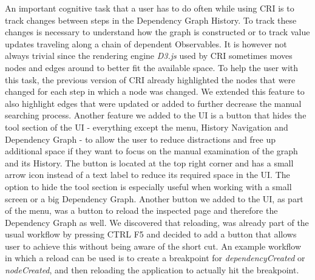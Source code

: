 An important cognitive task that a user has to do often while using CRI is to track changes between steps in the Dependency Graph History. To track these changes is necessary to understand how the graph is constructed or to track value updates traveling along a chain of dependent Observables. It is however not always trivial since the rendering engine \emph{D3.js} \cite{D3JS} used by CRI sometimes moves nodes and edges around to better fit the available space. To help the user with this task, the previous version of CRI already highlighted the nodes that were changed for each step in which a node was changed. We extended this feature to also highlight edges that were updated or added to further decrease the manual searching process. Another feature we added to the UI is a button that hides the tool section of the UI - everything except the menu, History Navigation and Dependency Graph - to allow the user to reduce distractions and free up additional space if they want to focus on the manual examination of the graph and its History. The button is located at the top right corner and has a small arrow icon instead of a text label to reduce its required space in the UI. The option to hide the tool section is especially useful when working with a small screen or a big Dependency Graph. Another button we added to the UI, as part of the menu, was a button to reload the inspected page and therefore the Dependency Graph as well. We discovered that reloading, was already part of the usual workflow by pressing CTRL F5 and decided to add a button that allows user to achieve this without being aware of the short cut. An example workflow in which a reload can be used is to create a breakpoint for \emph{dependencyCreated} or \emph{nodeCreated}, and then reloading the application to actually hit the breakpoint.
